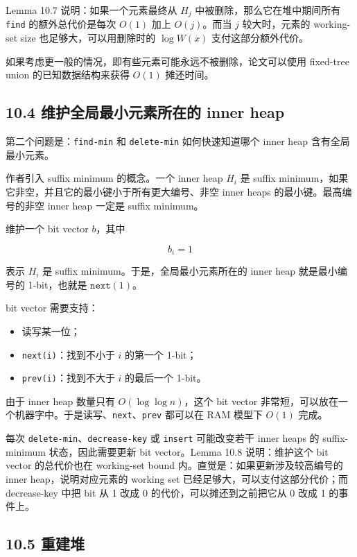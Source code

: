 \documentclass[UTF8]{ctexart}
\begin{document}
Lemma 10.7 说明：如果一个元素最终从 \(H_j\) 中被删除，那么它在堆中期间所有 \texttt{find} 的额外总代价是每次 \(O(1)\) 加上 \(O(j)\)。而当 \(j\) 较大时，元素的 working-set size 也足够大，可以用删除时的 \(\log W(x)\) 支付这部分额外代价。

如果考虑更一般的情况，即有些元素可能永远不被删除，论文可以使用 fixed-tree union 的已知数据结构来获得 \(O(1)\) 摊还时间。

\subsection*{10.4 维护全局最小元素所在的 inner heap}

第二个问题是：\texttt{find-min} 和 \texttt{delete-min} 如何快速知道哪个 inner heap 含有全局最小元素。

作者引入 suffix minimum 的概念。一个 inner heap \(H_i\) 是 suffix minimum，如果它非空，并且它的最小键小于所有更大编号、非空 inner heaps 的最小键。最高编号的非空 inner heap 一定是 suffix minimum。

维护一个 bit vector \(b\)，其中

\[
b_i=1
\]

表示 \(H_i\) 是 suffix minimum。于是，全局最小元素所在的 inner heap 就是最小编号的 1-bit，也就是 \(\texttt{next}(1)\)。

bit vector 需要支持：

\begin{itemize}
  \item 读写某一位；
  \item \texttt{next(i)}：找到不小于 \(i\) 的第一个 1-bit；
  \item \texttt{prev(i)}：找到不大于 \(i\) 的最后一个 1-bit。
\end{itemize}

由于 inner heap 数量只有 \(O(\log\log n)\)，这个 bit vector 非常短，可以放在一个机器字中。于是读写、\texttt{next}、\texttt{prev} 都可以在 RAM 模型下 \(O(1)\) 完成。

每次 \texttt{delete-min}、\texttt{decrease-key} 或 \texttt{insert} 可能改变若干 inner heaps 的 suffix-minimum 状态，因此需要更新 bit vector。Lemma 10.8 说明：维护这个 bit vector 的总代价也在 working-set bound 内。直觉是：如果更新涉及较高编号的 inner heap，说明对应元素的 working set 已经足够大，可以支付这部分代价；而 decrease-key 中把 bit 从 1 改成 0 的代价，可以摊还到之前把它从 0 改成 1 的事件上。

\subsection*{10.5 重建堆}
\end{document}
